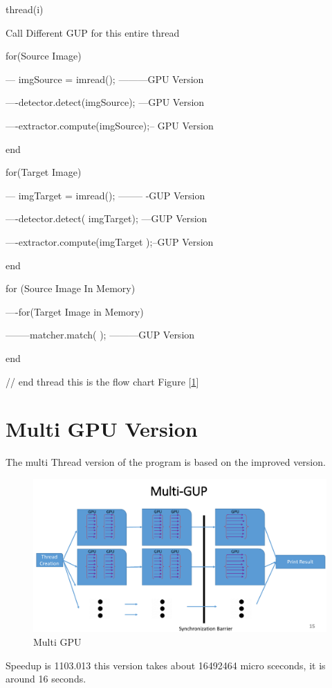 \documentclass[journal]{IEEEtran}
\begin{document}
 
thread(i) {

Call Different GUP for this entire thread

for(Source Image)

--- imgSource = imread(); ---------GPU Version

----detector.detect(imgSource); ---GPU Version

----extractor.compute(imgSource);-- GPU Version

end

for(Target Image)

--- imgTarget = imread(); -------- -GUP Version

----detector.detect( imgTarget); ---GUP Version

----extractor.compute(imgTarget );--GUP Version

end
	
for (Source Image In Memory)

----for(Target Image in Memory)

--------matcher.match( ); ---------GUP Version

end

} // end thread
this is the flow chart Figure [\ref{fig:figure15}]
\section{Multi GPU Version}
The multi Thread version of the program is based on the improved version. 
\begin{figure}[h]
	\centering
	\includegraphics[scale=0.15]{Figure/MultiGPU.png}
	\caption{ Multi GPU }
	\label{fig:figure15}
\end{figure} 

Speedup is 1103.013
this version takes about 16492464 micro sceconds, it is around 16 seconds. 
\end{document}
